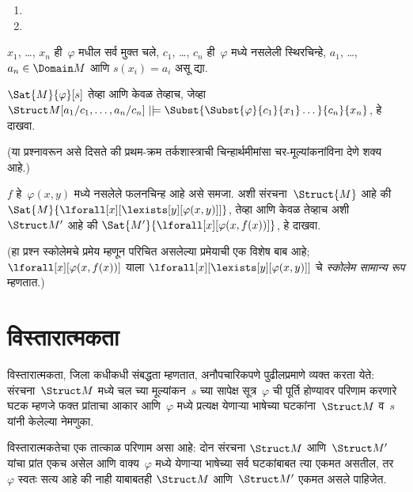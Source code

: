 \begin{prob}
\begin{enumerate}
\item

\item
\end{enumerate}
$x_1$, \dots, $x_n$ ही~$\varphi$ मधील सर्व मुक्त चले,
$c_1$, \dots, $c_n$ ही~$\varphi$ मध्ये नसलेली स्थिरचिन्हे,
$a_1$, \dots, $a_n \in \Domain M$ आणि $s(x_i) = a_i$ असू द्या.

$\Sat{M}{\varphi}[s]$ तेव्हा आणि केवळ तेव्हाच, जेव्हा
$\Struct M[a_1/c_1,\dots,a_n/c_n]
\VDash \Subst{\Subst{\varphi}{c_1}{x_1}\dots}{c_n}{x_n}$, हे दाखवा.

(या प्रश्नावरून असे दिसते की प्रथम-क्रम तर्कशास्त्राची चिन्हार्थमीमांसा
चर-मूल्यांकनांविना देणे शक्य आहे.)
\end{prob}

\begin{prob}
$f$ हे~$\varphi(x,y)$ मध्ये नसलेले फलनचिन्ह आहे असे समजा. अशी
संरचना~$\Struct{M}$ आहे की
$\Sat{M}{\lforall[x][\lexists[y][\varphi(x,y)]]}$, तेव्हा आणि केवळ तेव्हाच
अशी~$\Struct M'$ आहे की
$\Sat{M'}{\lforall[x][\varphi(x,f(x))]}$, हे दाखवा.

(हा प्रश्न स्कोलेमचे प्रमेय म्हणून परिचित असलेल्या प्रमेयाची एक विशेष
बाब आहे; $\lforall[x][\varphi(x,f(x))]$ याला
$\lforall[x][\lexists[y][\varphi(x,y)]]$ चे \emph{स्कोलेम सामान्य रूप}
म्हणतात.)
\end{prob}












\section{विस्तारात्मकता}\label{fol:syn:ext:sec}

\begin{explain}
विस्तारात्मकता, जिला कधीकधी संबद्धता म्हणतात, अनौपचारिकपणे पुढीलप्रमाणे
व्यक्त करता येते: संरचना~$\Struct M$ मध्ये चल च्या
मूल्यांकन~$s$ च्या सापेक्ष सूत्र~$\varphi$ ची पूर्ति होण्यावर परिणाम
करणारे घटक म्हणजे फक्त प्रांताचा आकार आणि~$\varphi$ मध्ये प्रत्यक्ष
येणाऱ्या भाषेच्या घटकांना~$\Struct M$ व~$s$ यांनी केलेल्या नेमणुका.

विस्तारात्मकतेचा एक तात्काळ परिणाम असा आहे: दोन संरचना
$\Struct M$ आणि~$\Struct M'$ यांचा प्रांत एकच असेल आणि वाक्य~$\varphi$ मध्ये
येणाऱ्या भाषेच्या सर्व घटकांबाबत त्या एकमत असतील, तर~$\varphi$ स्वतः सत्य
आहे की नाही याबाबतही $\Struct M$ आणि~$\Struct M'$ एकमत असले पाहिजेत.
\end{explain}

